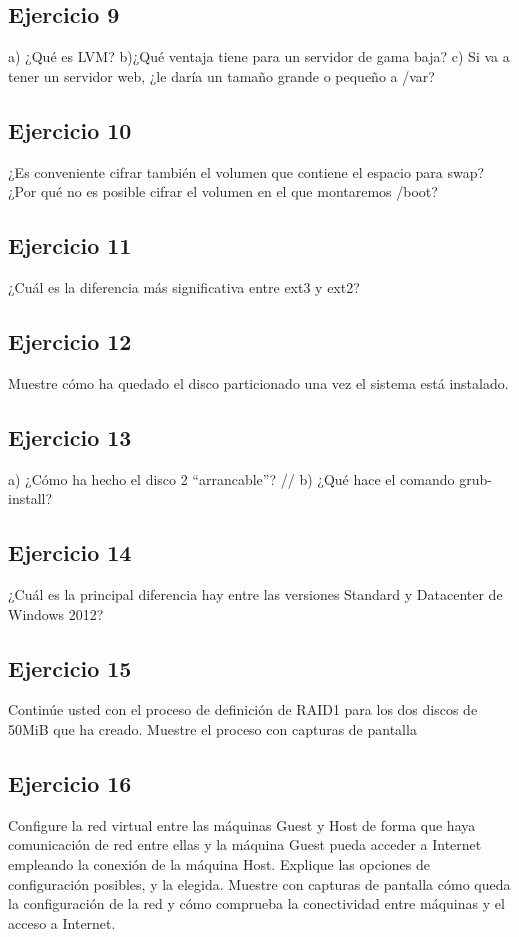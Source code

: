 \documentclass[a4paper, 11pt]{article} %
\begin{document}
\subsection*{Ejercicio 9}
a) ¿Qué es LVM? b)¿Qué ventaja tiene para un servidor de gama baja? c)
Si va a tener un servidor web, ¿le daría un tamaño grande o pequeño a /var?


\subsection*{Ejercicio 10}
¿Es conveniente cifrar también el volumen que contiene el espacio para
swap? ¿Por qué no es posible cifrar el volumen en el que montaremos /boot?


\subsection*{Ejercicio 11}
¿Cuál es la diferencia más significativa entre ext3 y ext2?


\subsection*{Ejercicio 12}
Muestre cómo ha quedado el disco particionado una vez el sistema está
instalado.


\subsection*{Ejercicio 13}
a) ¿Cómo ha hecho el disco 2 “arrancable”? //
b) ¿Qué hace el comando grub-install?


\subsection*{Ejercicio 14}
¿Cuál es la principal diferencia hay entre las versiones Standard y
Datacenter de Windows 2012?


\subsection*{Ejercicio 15}
Continúe usted con el proceso de definición de RAID1 para los dos discos
de 50MiB que ha creado. Muestre el proceso con capturas de pantalla


\subsection*{Ejercicio 16}
Configure la red virtual entre las máquinas Guest y Host de forma que
haya comunicación de red entre ellas y la máquina Guest pueda acceder a Internet
empleando la conexión de la máquina Host. Explique las opciones de configuración
posibles, y la elegida. Muestre con capturas de pantalla cómo queda la configuración
de la red y cómo comprueba la conectividad entre máquinas y el acceso a Internet.
\end{document}

